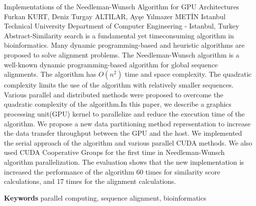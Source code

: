 
    \begin{abstract_online}{Implementations of the Needleman-Wunsch Algorithm for GPU Architectures}{%
        Furkan KURT, Deniz Turgay ALTILAR, Ayşe Yılmazer METİN}{%
        }{%
        Istanbul Technical University Department of Computer Engineering - Istanbul, Turkey}
    Abstract-Similarity search is a fundamental yet timeconsuming algorithm in bioinformatics. Many dynamic programming-based and heuristic algorithms are proposed to solve alignment problems. The Needleman-Wunsch algorithm is a well-known dynamic programming-based algorithm for global sequence alignments. The algorithm has $O\left(n^{2}\right)$ time and space complexity. The quadratic complexity limits the use of the algorithm with relatively smaller sequences. Various parallel and distributed methods were proposed to overcome the quadratic complexity of the algorithm.\newline In this paper, we describe a graphics processing unit(GPU) kernel to parallelize and reduce the execution time of the algorithm. We propose a new data partitioning method representation to increase the data transfer throughput between the GPU and the host. We implemented the serial approach of the algorithm and various parallel CUDA methods. We also used CUDA Cooperative Groups for the first time in Needleman-Wunsch algorithm parallelization. The evaluation shows that the new implementation is increased the performance of the algorithm 60 times for similarity score calculations, and 17 times for the alignment calculations. 
    
        \textbf{Keywords} \newline{}parallel computing, sequence alignment, bioinformatics
    \end{abstract_online}
    